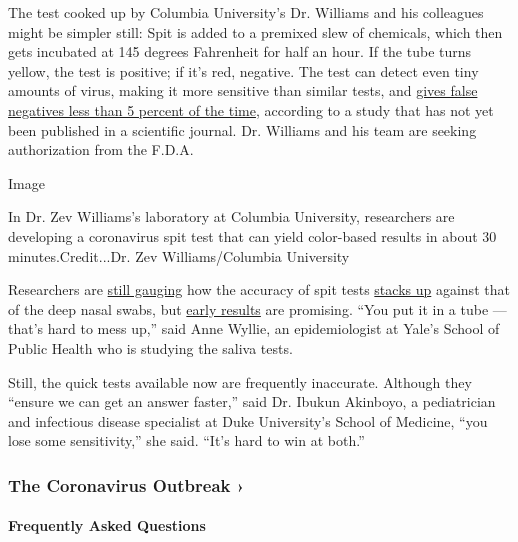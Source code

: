 The test cooked up by Columbia University's Dr. Williams and his
colleagues might be simpler still: Spit is added to a premixed slew of
chemicals, which then gets incubated at 145 degrees Fahrenheit for half
an hour. If the tube turns yellow, the test is positive; if it's red,
negative. The test can detect even tiny amounts of virus, making it more
sensitive than similar tests, and
\href{https://www.medrxiv.org/content/10.1101/2020.06.13.20129841v1.full.pdf}{gives
false negatives less than 5 percent of the time}, according to a study
that has not yet been published in a scientific journal. Dr. Williams
and his team are seeking authorization from the F.D.A.

Image

In Dr. Zev Williams's laboratory at Columbia University, researchers are
developing a coronavirus spit test that can yield color-based results in
about 30 minutes.Credit...Dr. Zev Williams/Columbia University

Researchers are
\href{https://jamanetwork.com/journals/jama/fullarticle/2765837}{still
gauging} how the accuracy of spit tests
\href{https://pubmed.ncbi.nlm.nih.gov/32310815/}{stacks up} against that
of the deep nasal swabs, but
\href{https://www.medrxiv.org/content/10.1101/2020.04.16.20067835v1.full.pdf}{early
results} are promising. ``You put it in a tube --- that's hard to mess
up,'' said Anne Wyllie, an epidemiologist at Yale's School of Public
Health who is studying the saliva tests.

Still, the quick tests available now are frequently inaccurate. Although
they ``ensure we can get an answer faster,'' said Dr. Ibukun Akinboyo, a
pediatrician and infectious disease specialist at Duke University's
School of Medicine, ``you lose some sensitivity,'' she said. ``It's hard
to win at both.''

\href{https://www.nytimes.com/news-event/coronavirus?action=click\&pgtype=Article\&state=default\&region=MAIN_CONTENT_3\&context=storylines_faq}{}

\hypertarget{the-coronavirus-outbreak-}{%
\subsubsection{The Coronavirus Outbreak
›}\label{the-coronavirus-outbreak-}}

\hypertarget{frequently-asked-questions}{%
\paragraph{Frequently Asked
Questions}\label{frequently-asked-questions}}

